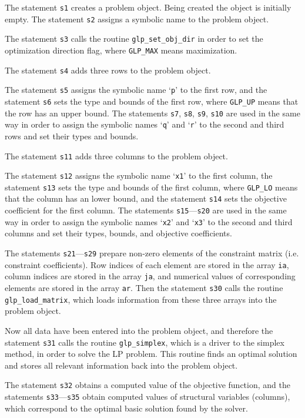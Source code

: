 The statement \verb|s1| creates a problem object. Being created the
object is initially empty. The statement \verb|s2| assigns a symbolic
name to the problem object.

The statement \verb|s3| calls the routine \verb|glp_set_obj_dir| in
order to set the optimization direction flag, where \verb|GLP_MAX|
means maximization.

The statement \verb|s4| adds three rows to the problem object.

The statement \verb|s5| assigns the symbolic name `\verb|p|' to the
first row, and the statement \verb|s6| sets the type and bounds of the
first row, where \verb|GLP_UP| means that the row has an upper bound.
The statements \verb|s7|, \verb|s8|, \verb|s9|, \verb|s10| are used in
the same way in order to assign the symbolic names `\verb|q|' and
`\verb|r|' to the second and third rows and set their types and bounds.

The statement \verb|s11| adds three columns to the problem object.

The statement \verb|s12| assigns the symbolic name `\verb|x1|' to the
first column, the statement \verb|s13| sets the type and bounds of the
first column, where \verb|GLP_LO| means that the column has an lower
bound, and the statement \verb|s14| sets the objective coefficient for
the first column. The statements \verb|s15|---\verb|s20| are used in
the same way in order to assign the symbolic names `\verb|x2|' and
`\verb|x3|' to the second and third columns and set their types,
bounds, and objective coefficients.

The statements \verb|s21|---\verb|s29| prepare non-zero elements of the
constraint matrix (i.e. constraint coefficients). Row indices of each
element are stored in the array \verb|ia|, column indices are stored in
the array \verb|ja|, and numerical values of corresponding elements are
stored in the array \verb|ar|. Then the statement \verb|s30| calls
the routine \verb|glp_load_matrix|, which loads information from these
three arrays into the problem object.

Now all data have been entered into the problem object, and therefore
the statement \verb|s31| calls the routine \verb|glp_simplex|, which is
a driver to the simplex method, in order to solve the LP problem. This
routine finds an optimal solution and stores all relevant information
back into the problem object.

The statement \verb|s32| obtains a computed value of the objective
function, and the statements \verb|s33|---\verb|s35| obtain computed
values of structural variables (columns), which correspond to the
optimal basic solution found by the solver.

